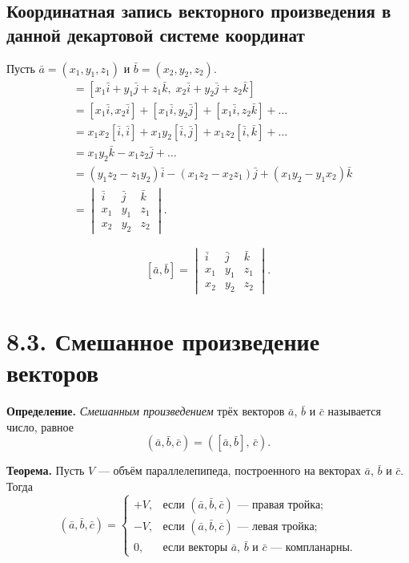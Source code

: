 \documentclass[12pt,a4paper]{article}
\newcommand{\va}{\bar{a}}
\newcommand{\vb}{\bar{b}}
\newcommand{\vc}{\bar{c}}
\newcommand{\vi}{\bar{i}}
\newcommand{\vj}{\bar{j}}
\newcommand{\vk}{\bar{k}}
\begin{document}
\subsection*{Координатная запись векторного произведения в данной
декартовой системе координат}

Пусть $\va = (x_1, y_1, z_1)$ и $\vb = (x_2, y_2, z_2)$.
\begin{align*}
  [\va, \vb]
  &= [x_1\vi + y_1\vj + z_1\vk,\; x_2\vi + y_2\vj + z_2\vk] \\
  &= [x_1\vi, x_2\vi] + [x_1\vi, y_2\vj] + [x_1\vi, z_2\vk] + \ldots \\
  &= x_1x_2[\vi,\vi] + x_1y_2[\vi,\vj] + x_1z_2[\vi,\vk] + \ldots \\
  &= x_1y_2\vk - x_1z_2\vj + \ldots \\
  &= (y_1z_2 - z_1y_2)\vi - (x_1z_2 - x_2z_1)\vj + (x_1y_2 - y_1x_2)\vk \\
  &=
  \begin{vmatrix} \vi & \vj & \vk \\ x_1 & y_1 & z_1 \\ x_2 & y_2 & z_2
  \end{vmatrix}.
\end{align*}

$$
\boxed{[\va, \vb] =
  \begin{vmatrix} \vi & \vj & \vk \\ x_1 & y_1 & z_1 \\ x_2 & y_2 & z_2
\end{vmatrix}.}
$$

\section*{8.3. Смешанное произведение векторов}

\textbf{Определение.} \textit{Смешанным произведением} трёх векторов
$\va$, $\vb$ и $\vc$ называется число, равное
$$
(\va, \vb, \vc) = ([\va, \vb],\, \vc).
$$

\textbf{Теорема.} Пусть $V$ --- объём параллелепипеда, построенного
на векторах $\va$, $\vb$ и $\vc$. Тогда
$$
(\va, \vb, \vc) =
\begin{cases}
  +V, & \text{если } (\va, \vb, \vc) \text{ --- правая тройка;}\\
  -V, & \text{если } (\va, \vb, \vc) \text{ --- левая тройка;}\\
  0,  & \text{если векторы } \va,\, \vb \text{ и } \vc \text{ --- компланарны.}
\end{cases}
$$
\end{document}
